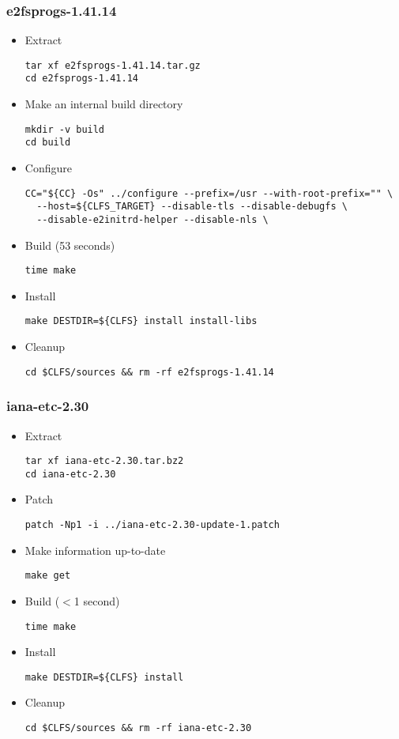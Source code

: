  \subsubsection{e2fsprogs-1.41.14}
  \begin{itemize}
  \item Extract
    \begin{lstlisting}
tar xf e2fsprogs-1.41.14.tar.gz
cd e2fsprogs-1.41.14
    \end{lstlisting}
  \item Make an internal build directory
    \begin{lstlisting}
mkdir -v build
cd build
    \end{lstlisting}
  \item Configure
    \begin{lstlisting}
CC="${CC} -Os" ../configure --prefix=/usr --with-root-prefix="" \
  --host=${CLFS_TARGET} --disable-tls --disable-debugfs \
  --disable-e2initrd-helper --disable-nls \
    \end{lstlisting}
  \item Build (53 seconds)
    \begin{lstlisting}
time make
    \end{lstlisting}
  \item Install
    \begin{lstlisting}
make DESTDIR=${CLFS} install install-libs
    \end{lstlisting}
  \item Cleanup
    \begin{lstlisting}
cd $CLFS/sources && rm -rf e2fsprogs-1.41.14
    \end{lstlisting}
  \end{itemize}
 \subsubsection{iana-etc-2.30}
  \begin{itemize}
  \item Extract
\begin{lstlisting}
tar xf iana-etc-2.30.tar.bz2
cd iana-etc-2.30
\end{lstlisting}
  \item Patch
\begin{lstlisting}
patch -Np1 -i ../iana-etc-2.30-update-1.patch
\end{lstlisting}
  \item Make information up-to-date
\begin{lstlisting}
make get
\end{lstlisting}
  \item Build ($<$1 second)
\begin{lstlisting}
time make
\end{lstlisting}
  \item Install
\begin{lstlisting}
make DESTDIR=${CLFS} install
\end{lstlisting}
  \item Cleanup
\begin{lstlisting}
cd $CLFS/sources && rm -rf iana-etc-2.30
\end{lstlisting}
 \end{itemize}
